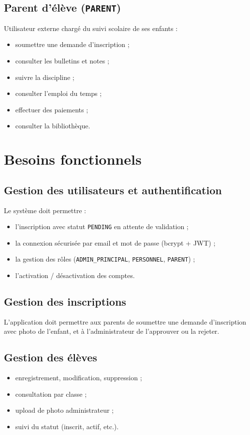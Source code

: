 \documentclass[12pt, a4paper]{report}
\begin{document}
\subsection{Parent d'élève (\texttt{PARENT})}
Utilisateur externe chargé du suivi scolaire de ses enfants :
\begin{itemize}[noitemsep]
    \item soumettre une demande d'inscription ;
    \item consulter les bulletins et notes ;
    \item suivre la discipline ;
    \item consulter l'emploi du temps ;
    \item effectuer des paiements ;
    \item consulter la bibliothèque.
\end{itemize}

\section{Besoins fonctionnels}

\subsection{Gestion des utilisateurs et authentification}
Le système doit permettre :
\begin{itemize}[noitemsep]
    \item l'inscription avec statut \texttt{PENDING} en attente de validation ;
    \item la connexion sécurisée par email et mot de passe (bcrypt + JWT) ;
    \item la gestion des rôles (\texttt{ADMIN\_PRINCIPAL}, \texttt{PERSONNEL}, \texttt{PARENT}) ;
    \item l'activation / désactivation des comptes.
\end{itemize}

\subsection{Gestion des inscriptions}
L'application doit permettre aux parents de soumettre une demande d'inscription avec photo de l'enfant, et à l'administrateur de l'approuver ou la rejeter.

\subsection{Gestion des élèves}
\begin{itemize}[noitemsep]
    \item enregistrement, modification, suppression ;
    \item consultation par classe ;
    \item upload de photo administrateur ;
    \item suivi du statut (inscrit, actif, etc.).
\end{itemize}
\end{document}
